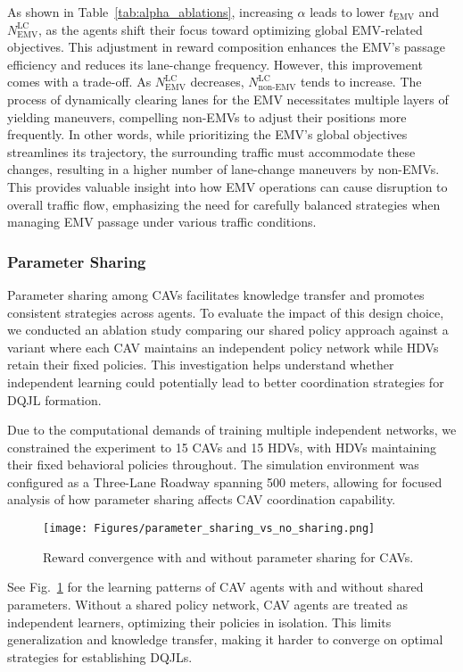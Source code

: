 As shown in Table~\ref{tab:alpha_ablations}, increasing \(\alpha\) leads to lower \(t_{\text{EMV}}\) and \(N_{\text{EMV}}^{\text{LC}}\), as the agents shift their focus toward optimizing global EMV-related objectives. This adjustment in reward composition enhances the EMV’s passage efficiency and reduces its lane-change frequency. However, this improvement comes with a trade-off. As \(N_{\text{EMV}}^{\text{LC}}\) decreases, \(N_{\text{non-EMV}}^{\text{LC}}\) tends to increase. The process of dynamically clearing lanes for the EMV necessitates multiple layers of yielding maneuvers, compelling non-EMVs to adjust their positions more frequently. In other words, while prioritizing the EMV’s global objectives streamlines its trajectory, the surrounding traffic must accommodate these changes, resulting in a higher number of lane-change maneuvers by non-EMVs. This provides valuable insight into how EMV operations can cause disruption to overall traffic flow, emphasizing the need for carefully balanced strategies when managing EMV passage under various traffic conditions.
\subsubsection{Parameter Sharing}\label{subsec:parameters_sharing}
Parameter sharing among CAVs facilitates knowledge transfer and promotes consistent strategies across agents. To evaluate the impact of this design choice, we conducted an ablation study comparing our shared policy approach against a variant where each CAV maintains an independent policy network while HDVs retain their fixed policies. This investigation helps understand whether independent learning could potentially lead to better coordination strategies for DQJL formation.

Due to the computational demands of training multiple independent networks, we constrained the experiment to 15 CAVs and 15 HDVs, with HDVs maintaining their fixed behavioral policies throughout. The simulation environment was configured as a Three-Lane Roadway spanning 500 meters, allowing for focused analysis of how parameter sharing affects CAV coordination capability.

\begin{figure}[htbp]
    \centering
    \texttt{[image: Figures/parameter\_sharing\_vs\_no\_sharing.png]}
    \caption{Reward convergence with and without parameter sharing for CAVs.}
    \label{fig:parameter_sharing}
\end{figure}
See Fig.~\ref{fig:parameter_sharing} for the learning patterns of CAV agents with and without shared parameters. Without a shared policy network, CAV agents are treated as independent learners, optimizing their policies in isolation. This limits generalization and knowledge transfer, making it harder to converge on optimal strategies for establishing DQJLs.


